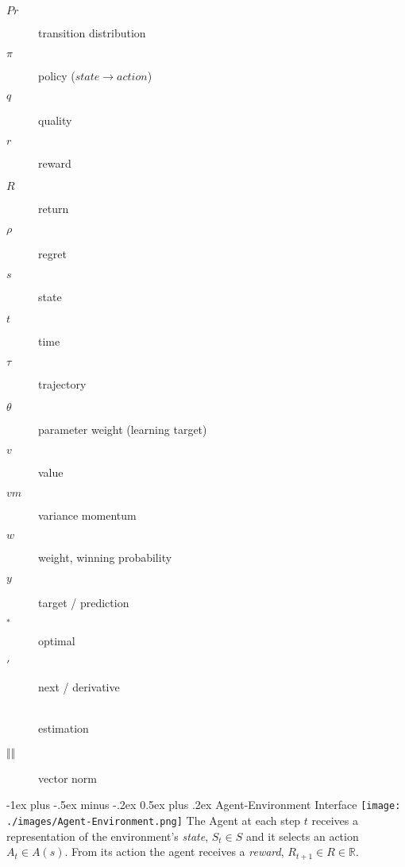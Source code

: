 \documentclass[10pt,landscape]{article}
\makeatletter
\renewcommand{\section}{\@startsection{section}{1}{0mm}%
    {-1ex plus -.5ex minus -.2ex}%
    {0.5ex plus .2ex}%
    {\normalfont\large\bfseries}}
\makeatother
\begin{document}
\begin{multicols}{3}
\begin{multicols}{2}
\begin{description}
    \item[$Pr$]
    transition distribution
    \item[$\pi$]
    policy ($state \rightarrow action$)
    \item[$q$]
    quality
    \item[$r$]
    reward
    \item[$R$]
    return
    \item[$\rho$]
    regret
    \item[$s$]
    state
    \item[$t$]
    time %
    \item[$\tau$]
    trajectory
    \item[$\theta$]
    parameter weight (learning target) %
    \item[$v$]
    value
    \item[$vm$]
    variance momentum
    \item[$w$]
    weight, winning probability
    \item[$y$]
    target / prediction %
    \item[$_\ast$]
    optimal
    \item[$'$]
    next / derivative
    \item[$\hat{}$]
    estimation
    \item[$\Vert\Vert$]
    vector norm
\end{description}
\end{multicols}

\section{Agent-Environment Interface}
\texttt{[image: ./images/Agent-Environment.png]}
The Agent at each step $t$ receives a representation of the environment's \emph{state},
$S_t \in S$ and it selects an action $A_t \in A(s)$.
From its action the agent receives a \emph{reward}, $R_{t + 1} \in R \in \mathbb{R}$.


\end{multicols}
\end{document}
